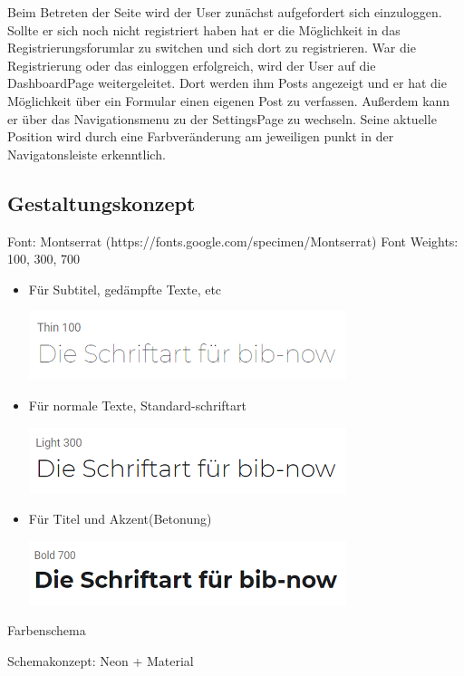 \documentclass[12pt,titlepage]{article}
\begin{document}
\vspace{2cm}


Beim Betreten der Seite wird der User zunächst aufgefordert sich einzuloggen. Sollte er sich noch nicht registriert haben hat er die Möglichkeit in das Registrierungsforumlar zu switchen und sich dort zu registrieren. War die Registrierung oder das einloggen erfolgreich, wird der User auf die DashboardPage weitergeleitet. Dort werden ihm Posts angezeigt und er hat die Möglichkeit über ein Formular einen eigenen Post zu verfassen. Außerdem kann er über das Navigationsmenu zu der SettingsPage zu wechseln. Seine aktuelle Position wird durch eine Farbveränderung am jeweiligen punkt in der Navigatonsleiste erkenntlich.

\newpage
\subsection{Gestaltungskonzept}

Font: Montserrat (https://fonts.google.com/specimen/Montserrat)
Font Weights: 100, 300, 700
\vspace{2cm}
\begin{itemize}
\item
	Für Subtitel, gedämpfte Texte, etc

\includegraphics{images/Schriftart_100.png}
\item
	Für normale Texte, Standard-schriftart

\includegraphics{images/Schriftart_300.png}
\item
	Für Titel und Akzent(Betonung)

\includegraphics{images/Schriftart_700.png}
\end{itemize}


Farbenschema

Schemakonzept: Neon + Material
\end{document}
